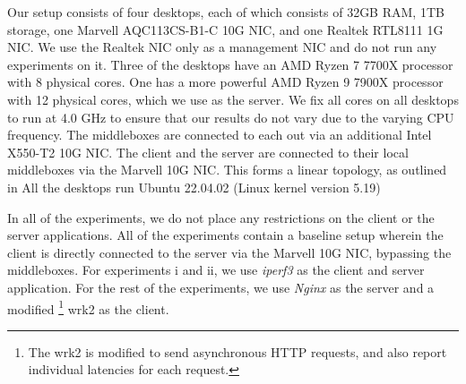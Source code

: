 Our setup consists of four desktops, each of which consists of 32GB RAM, 1TB storage, one Marvell AQC113CS-B1-C 10G NIC, and one Realtek RTL8111 1G NIC.
We use the Realtek NIC only as a management NIC and do not run any experiments on it.
Three of the desktops have an AMD Ryzen 7 7700X processor with 8 physical cores.
One has a more powerful AMD Ryzen 9 7900X processor with 12 physical cores, which we use as the server.
We fix all cores on all desktops to run at 4.0 GHz to ensure that our results do not vary due to the varying CPU frequency.
The middleboxes are connected to each out via an additional Intel X550-T2 10G NIC.
The client and the server are connected to their local middleboxes via the Marvell 10G NIC.
This forms a linear topology, as outlined in 
All the desktops run Ubuntu 22.04.02 (Linux kernel version 5.19)

In all of the experiments, we do not place any restrictions on the client or the server applications.
All of the experiments contain a baseline setup wherein the client is directly connected to the server via the Marvell 10G NIC, bypassing the middleboxes.
For experiments i and ii, we use \textit{iperf3} \cite{iPerf3} as the client and server application.
For the rest of the experiments, we use \textit{Nginx} \cite{nginx} as the server and a modified 
\footnote{The wrk2 is modified to send asynchronous HTTP requests, and also report individual latencies for each request.}
wrk2 \cite{wrk2} as the client.